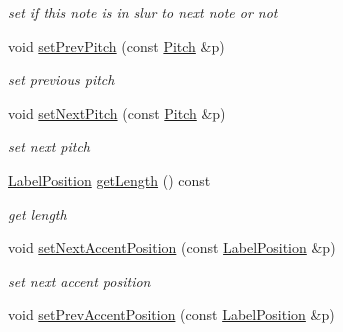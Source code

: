 \begin{DoxyCompactItemize}
\begin{DoxyCompactList}\small\item\em set if this note is in slur to next note or not \end{DoxyCompactList}\item 
\hypertarget{classsinsy_1_1NoteLabeler_a4cfaaf6fb7f0c43dc27e8583456c89a6}{void \hyperlink{classsinsy_1_1NoteLabeler_a4cfaaf6fb7f0c43dc27e8583456c89a6}{set\-Prev\-Pitch} (const \hyperlink{classsinsy_1_1Pitch}{\-Pitch} \&p)}\label{classsinsy_1_1NoteLabeler_a4cfaaf6fb7f0c43dc27e8583456c89a6}

\begin{DoxyCompactList}\small\item\em set previous pitch \end{DoxyCompactList}\item 
\hypertarget{classsinsy_1_1NoteLabeler_aecd9c1c38124746b15e5cf9ed158b146}{void \hyperlink{classsinsy_1_1NoteLabeler_aecd9c1c38124746b15e5cf9ed158b146}{set\-Next\-Pitch} (const \hyperlink{classsinsy_1_1Pitch}{\-Pitch} \&p)}\label{classsinsy_1_1NoteLabeler_aecd9c1c38124746b15e5cf9ed158b146}

\begin{DoxyCompactList}\small\item\em set next pitch \end{DoxyCompactList}\item 
\hypertarget{classsinsy_1_1NoteLabeler_aeeb9701786f11b28567af19fde462883}{\hyperlink{classsinsy_1_1LabelPosition}{\-Label\-Position} \hyperlink{classsinsy_1_1NoteLabeler_aeeb9701786f11b28567af19fde462883}{get\-Length} () const }\label{classsinsy_1_1NoteLabeler_aeeb9701786f11b28567af19fde462883}

\begin{DoxyCompactList}\small\item\em get length \end{DoxyCompactList}\item 
\hypertarget{classsinsy_1_1NoteLabeler_a71a9479c90f11c463f7c0b0bf7791171}{void \hyperlink{classsinsy_1_1NoteLabeler_a71a9479c90f11c463f7c0b0bf7791171}{set\-Next\-Accent\-Position} (const \hyperlink{classsinsy_1_1LabelPosition}{\-Label\-Position} \&p)}\label{classsinsy_1_1NoteLabeler_a71a9479c90f11c463f7c0b0bf7791171}

\begin{DoxyCompactList}\small\item\em set next accent position \end{DoxyCompactList}\item 
\hypertarget{classsinsy_1_1NoteLabeler_af1c1addbc22436b34a6745516575df6c}{void \hyperlink{classsinsy_1_1NoteLabeler_af1c1addbc22436b34a6745516575df6c}{set\-Prev\-Accent\-Position} (const \hyperlink{classsinsy_1_1LabelPosition}{\-Label\-Position} \&p)}\label{classsinsy_1_1NoteLabeler_af1c1addbc22436b34a6745516575df6c}


\end{DoxyCompactItemize}
